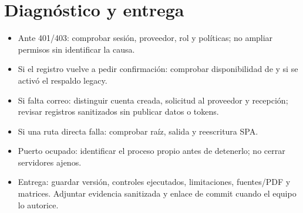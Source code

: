 \documentclass[11pt,a4paper]{article}
\begin{document}
\section{Diagnóstico y entrega}
\begin{itemize}
\item Ante 401/403: comprobar sesión, proveedor, rol y políticas; no ampliar permisos
sin identificar la causa.
\item Si el registro vuelve a pedir confirmación: comprobar disponibilidad de
 y si se activó el respaldo legacy.
\item Si falta correo: distinguir cuenta creada, solicitud al proveedor y recepción;
revisar registros sanitizados sin publicar datos o tokens.
\item Si una ruta directa falla: comprobar raíz, salida  y reescritura SPA.
\item Puerto ocupado: identificar el proceso propio antes de detenerlo; no cerrar
servidores ajenos.
\item Entrega: guardar versión, controles ejecutados, limitaciones, fuentes/PDF y
matrices. Adjuntar evidencia sanitizada y enlace de commit cuando el equipo lo autorice.
\end{itemize}
\end{document}

